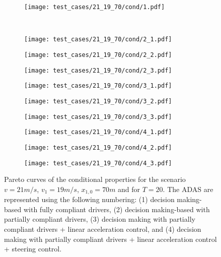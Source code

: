 \begin{figure}[H]
\centering
\begin{subfigure}{0.32\textwidth}
  \centering
  \texttt{[image: test\_cases/21\_19\_70/cond/1.pdf]}
\end{subfigure}\\
\begin{subfigure}{0.32\textwidth}
  \centering
  \texttt{[image: test\_cases/21\_19\_70/cond/2\_1.pdf]}
\end{subfigure} 
\begin{subfigure}{0.32\textwidth}
  \centering
  \texttt{[image: test\_cases/21\_19\_70/cond/2\_2.pdf]}
\end{subfigure}
\begin{subfigure}{0.32\textwidth}
  \centering
  \texttt{[image: test\_cases/21\_19\_70/cond/2\_3.pdf]}
\end{subfigure}
\begin{subfigure}{0.32\textwidth}
  \centering
  \texttt{[image: test\_cases/21\_19\_70/cond/3\_1.pdf]}
\end{subfigure}
\begin{subfigure}{0.32\textwidth}
  \centering
  \texttt{[image: test\_cases/21\_19\_70/cond/3\_2.pdf]}
\end{subfigure}
\begin{subfigure}{0.32\textwidth}
  \centering
  \texttt{[image: test\_cases/21\_19\_70/cond/3\_3.pdf]}
\end{subfigure}
\begin{subfigure}{0.32\textwidth}
  \centering
  \texttt{[image: test\_cases/21\_19\_70/cond/4\_1.pdf]}
\end{subfigure} 
\begin{subfigure}{0.32\textwidth}
  \centering
  \texttt{[image: test\_cases/21\_19\_70/cond/4\_2.pdf]}
\end{subfigure}
\begin{subfigure}{0.32\textwidth}
  \centering
  \texttt{[image: test\_cases/21\_19\_70/cond/4\_3.pdf]}
\end{subfigure}
\caption{Pareto curves of the conditional properties for the scenario $v = 21m/s$, $v_1 = 19m/s$, $x_{1,0} = 70m$ and for $T = 20$. The ADAS are represented using the following numbering: (1) decision making-based with fully compliant drivers, (2) decision making-based with partially compliant drivers, (3) decision making with partially compliant drivers + linear acceleration control, and (4) decision making with partially compliant drivers + linear acceleration control + steering control.}
\label{fig:test_case_1_cond}
\end{figure}

